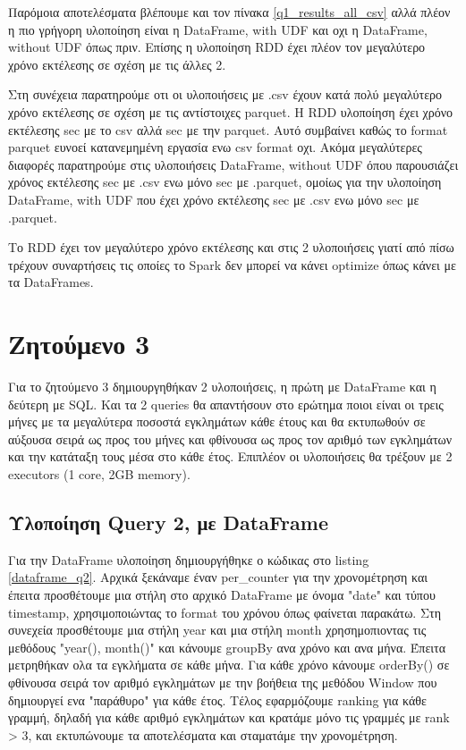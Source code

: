 \documentclass[12pt, a4paper]{article}
\begin{document}
Παρόμοια αποτελέσματα
βλέπουμε και τον πίνακα \ref{q1_results_all_csv} αλλά πλέον η πιο γρήγορη
υλοποίηση είναι η DataFrame, with UDF και οχι η DataFrame, without UDF όπως
πριν. Επίσης η υλοποίηση RDD έχει πλέον τον μεγαλύτερο χρόνο εκτέλεσης σε σχέση
με τις άλλες 2.

Στη συνέχεια παρατηρούμε οτι οι υλοποιήσεις με .csv έχουν κατά πολύ μεγαλύτερο χρόνο
εκτέλεσης σε σχέση με τις αντίστοιχες parquet. Η RDD υλοποίηση
έχει χρόνο εκτέλεσης  sec με το csv αλλά  sec με την parquet.
Αυτό συμβαίνει καθώς το format parquet ευνοεί κατανεμημένη εργασία ενω csv format οχι.
Ακόμα μεγαλύτερες διαφορές παρατηρούμε στις υλοποιήσεις DataFrame, without UDF όπου
παρουσιάζει χρόνος εκτέλεσης  sec με .csv ενω μόνο  sec με 
.parquet, ομοίως για την υλοποίηση DataFrame, with UDF που έχει χρόνο
εκτέλεσης  sec με .csv ενω μόνο  sec με .parquet. 

Το RDD έχει τον μεγαλύτερο χρόνο εκτέλεσης και στις 2 υλοποιήσεις γιατί από πίσω 
τρέχουν συναρτήσεις τις οποίες το Spark δεν μπορεί να κάνει optimize όπως κάνει με τα DataFrames.


\section*{Ζητούμενο 3}

Για το ζητούμενο 3 δημιουργηθήκαν 2 υλοποιήσεις, η πρώτη με DataFrame και η δεύτερη με
SQL. Και τα 2 queries θα απαντήσουν στο ερώτημα ποιοι είναι οι τρεις μήνες
με τα μεγαλύτερα ποσοστά εγκλημάτων κάθε έτους και θα εκτυπωθούν σε αύξουσα σειρά
ως προς του μήνες και φθίνουσα ως προς τον αριθμό των εγκλημάτων και την κατάταξη τους 
μέσα στο κάθε έτος. Επιπλέον οι υλοποιήσεις θα τρέξουν με 2 executors (1 core, 2GB memory).


\subsection*{Υλοποίηση Query 2, με DataFrame}

Για την DataFrame υλοποίηση δημιουργήθηκε ο κώδικας στο listing \ref{dataframe_q2}.
Αρχικά ξεκάναμε έναν per\_counter για την χρονομέτρηση και έπειτα προσθέτουμε μια στήλη
στο αρχικό DataFrame με όνομα "date" και τύπου timestamp, χρησιμοποιώντας το format
του χρόνου όπως φαίνεται παρακάτω. Στη συνεχεία προσθέτουμε μια στήλη year και 
μια στήλη month  χρησημοπιοντας τις μεθόδους "year(), month()" και κάνουμε groupBy
ανα χρόνο και ανα μήνα. Έπειτα μετρηθήκαν ολα τα εγκλήματα σε κάθε μήνα. Για κάθε χρόνο 
κάνουμε orderBy() σε φθίνουσα σειρά τον αριθμό εγκλημάτων με την βοήθεια της μεθόδου
Window που δημιουργεί ενα "παράθυρο" για κάθε έτος. Τέλος εφαρμόζουμε ranking για κάθε
γραμμή, δηλαδή για κάθε αριθμό εγκλημάτων και κρατάμε μόνο τις γραμμές με rank > 3, 
και εκτυπώνουμε τα αποτελέσματα και σταματάμε την χρονομέτρηση.
\end{document}
